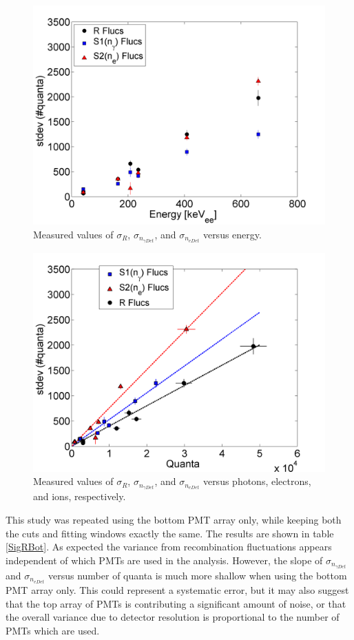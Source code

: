 \documentclass[a4paper,12pt]{article}
\begin{document}
{\begin{figure}[H]
\centering
\includegraphics[scale=0.5]{EnergyFluctuations.png}
\caption{Measured values of $\sigma_{R}$, $\sigma_{n_{\gamma Det}}$, and $\sigma_{n_{e Det}}$ versus energy.}
\label{EnergyFluc}
\end{figure}

\begin{figure}[H]
\centering
\includegraphics[scale=0.5]{QuantaFluctuations.png}
\caption{Measured values of $\sigma_{R}$, $\sigma_{n_{\gamma Det}}$, and $\sigma_{n_{e Det}}$ versus photons, electrons, and ions, respectively.}
\label{QuantaFluc}
\end{figure}

This study was repeated using the bottom PMT array only, while keeping both the cuts and fitting windows exactly the same.  The results are shown in table \ref{SigRBot}.  As expected the variance from recombination fluctuations appears independent of which PMTs are used in the analysis.  However, the slope of $\sigma_{n_{\gamma Det}}$ and $\sigma_{n_{e Det}}$ versus number of quanta is much more shallow when using the bottom PMT array only.  This could represent a systematic error, but it may also suggest that the top array of PMTs is contributing a significant amount of noise, or that the overall variance due to detector resolution is proportional to the number of PMTs which are used.  

}
\end{document}
